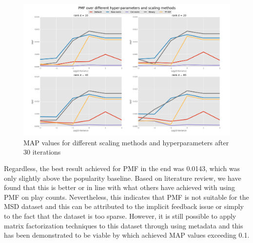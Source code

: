 \documentclass[11pt,preprint]{aastex}
\begin{document}
\begin{figure}[htbp] %
   \centering
   \includegraphics[width=6in]{../plots/final/PMF.png} 
   \caption{MAP values for different scaling methods and hyperparameters after 30 iterations}
   \label{PMF}
\end{figure}
 
Regardless, the best result achieved for PMF in the end was 0.0143, which was only slightly above the popularity baseline. Based on literature review, we have found that this is better or in line with what others have achieved with using PMF on play counts. Nevertheless, this indicates that PMF is not suitable for the MSD dataset and this can be attributed to the implicit feedback issue or simply to the fact that the dataset is too sparse. However, it is still possible to apply matrix factorization techniques to this dataset through using metadata and this has been demonstrated to be viable by \citet{liangcodebook} which achieved MAP values exceeding 0.1.  

\citep{hu2008collaborative}





%
\end{document}
